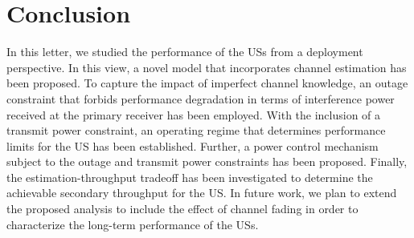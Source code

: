 \documentclass[letterpaper, twocolumn]{IEEEtran}
\begin{document}
\section{Conclusion} \label{sec:conc}
In this letter, we studied the performance of the USs from a deployment perspective. In this view, a novel model that incorporates channel estimation has been proposed. To capture the impact of imperfect channel knowledge, an outage constraint that forbids performance degradation in terms of interference power received at the primary receiver has been employed. With the inclusion of a transmit power constraint, an operating regime that determines performance limits for the US has been established. Further, a power control mechanism subject to the outage and transmit power constraints has been proposed. Finally, the estimation-throughput tradeoff has been investigated to determine the achievable secondary throughput for the US. In future work, we plan to extend the proposed analysis to include the effect of channel fading in order to characterize the long-term performance of the USs. 





\end{document}
